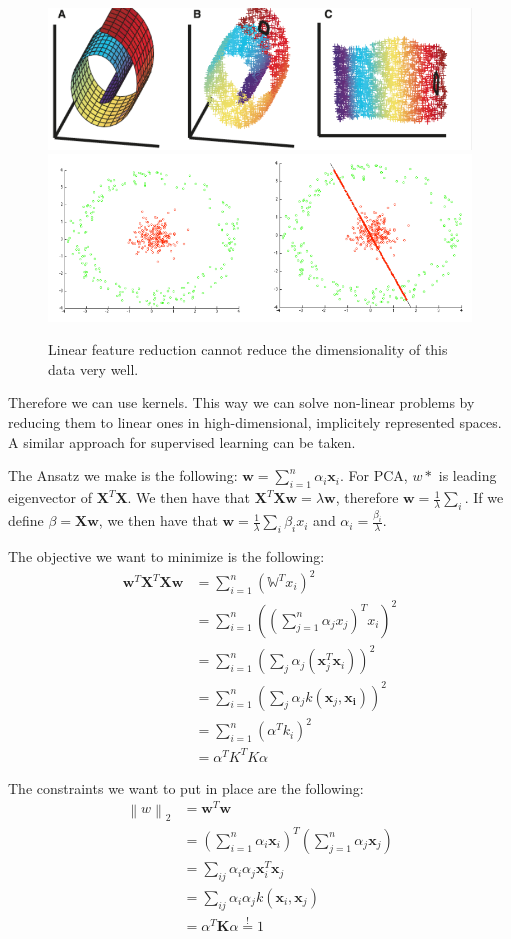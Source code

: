 \documentclass[a4paper,10pt,twoside]{article}
\newcommand\norm[1]{\left\lVert#1\right\rVert}
\begin{document}
\begin{figure}
    \centering
    \includegraphics[width=.495\textwidth]{figures/failure_linear_feature_reduction.png}
    \hfill
    \includegraphics[width=.495\textwidth]{figures/failure_linear_feature_reduction_2.png}
    \caption{Linear feature reduction cannot reduce the dimensionality of this data very well.}
    \label{failure_linear_feature_reduction}
\end{figure}

Therefore we can use kernels. This way we can solve non-linear problems by reducing them to linear ones in high-dimensional, implicitely represented spaces. A similar approach for supervised learning can be taken.

The Ansatz we make is the following:
$\mathbf{w}=\sum_{i=1}^{n}\alpha_i\mathbf{x}_i$. For PCA, $w*$ is leading eigenvector of $\mathbf{X}^T\mathbf{X}$. We then have that $\mathbf{X}^T\mathbf{X}\mathbf{w}=\lambda\mathbf{w}$, therefore $\mathbf{w}=\frac{1}{\lambda}\sum_{i}$. If we define $\beta = \mathbf{X}\mathbf{w}$, we then have that $\mathbf{w}=\frac{1}{\lambda}\sum_{i}\beta_i x_i$ and $\alpha_i=\frac{\beta_i}{\lambda}$.

The objective we want to minimize is the following:
\begin{align*}
    \mathbf{w}^T\mathbf{X}^T\mathbf{X}\mathbf{w}&=\sum_{i=1}^{n}(\mathbb{W}^Tx_i)^2\\
    &=\sum_{i=1}^{n}((\sum_{j=1}^{n}\alpha_jx_j)^Tx_i)^2\\
    &=\sum_{i=1}^{n}(\sum_{j}\alpha_j(\mathbf{x}_j^T \mathbf{x}_i))^2\\
    &=\sum_{i=1}^{n}(\sum_{j}\alpha_j k(\mathbf{x}_j, \mathbf{x_i}))^2\\
    &=\sum_{i=1}^{n}(\alpha^T k_i)^2\\
    &=\alpha^T K^T K\alpha
\end{align*}

The constraints we want to put in place are the following:
\begin{align*}
    \norm{w}_2&=\mathbf{w}^T\mathbf{w}\\
    &=(\sum_{i=1}^{n}\alpha_i\mathbf{x}_i)^T(\sum_{j=1}^{n}\alpha_j\mathbf{x}_j)\\
    &=\sum_{ij}\alpha_i\alpha_j\mathbf{x}_i^T \mathbf{x}_j\\
    &=\sum_{ij}\alpha_i\alpha_jk(\mathbf{x}_i,\mathbf{x}_j)\\
    &=\alpha^T\mathbf{K}\alpha\stackrel{!}{=}1
\end{align*}
\end{document}
